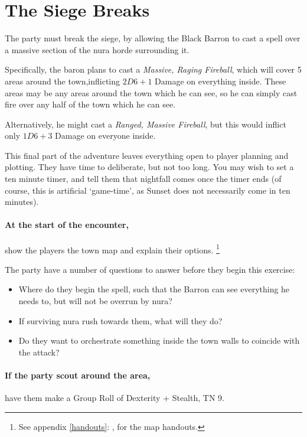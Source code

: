 \section{The Siege Breaks}

\begin{multicols}{2}

\noindent
The party must break the siege, by allowing the Black Barron to cast a spell over a massive section of the nura horde surrounding it.

Specifically, the baron plans to cast a \textit{Massive, Raging Fireball}, which will cover 5 areas around the town,inflicting $2D6+1$ Damage on everything inside.
These areas may be any areas around the town which he can see, so he can simply cast fire over any half of the town which he can see.

Alternatively, he might cast a \textit{Ranged, Massive Fireball}, but this would inflict only $1D6 + 3$ Damage on everyone inside.

This final part of the adventure leaves everything open to player planning and plotting.
They have time to deliberate, but not too long.
You may wish to set a ten minute timer, and tell them that nightfall comes once the timer ends (of course, this is artificial `game-time', as Sunset does not necessarily come in ten minutes).

\paragraph{At the start of the encounter,}
show the players the town map and explain their options.%
\footnote{See appendix \ref{handouts}: , for the map handouts.}

The party have a number of questions to answer before they begin this exercise:

\begin{itemize}

	\item{Where do they begin the spell, such that the Barron can see everything he needs to, but will not be overrun by nura?}
	\item{If surviving nura rush towards them, what will they do?}
	\item{Do they want to orchestrate something inside the town walls to coincide with the attack?}

\end{itemize}

\paragraph{If the party scout around the area,}
have them make a Group Roll of Dexterity + Stealth, TN 9.


\end{multicols}
